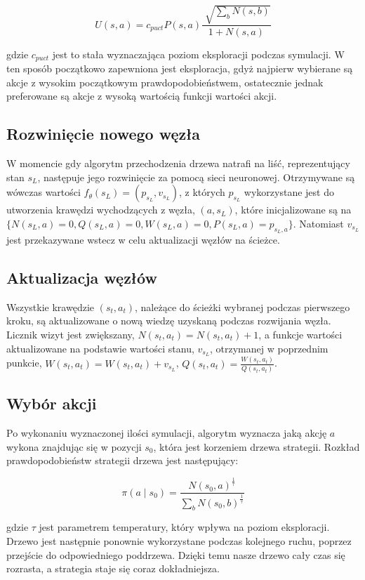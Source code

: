 \documentclass[licencjacka]{pracamgr}
\begin{document}
$$ U(s,a) = c_{puct} P(s,a) \frac{\sqrt[]{\sum_b N(s,b)}}{1 + N(s,a)} $$ 

gdzie $c_{puct}$ jest to stała wyznaczająca poziom eksploracji podczas symulacji. W ten sposób początkowo zapewniona jest eksploracja, gdyż najpierw wybierane są akcje z wysokim początkowym prawdopodobieństwem, ostatecznie jednak preferowane są akcje z wysoką wartością funkcji wartości akcji.

\subsection{Rozwinięcie nowego węzła}

W momencie gdy algorytm przechodzenia drzewa natrafi na liść, reprezentujący stan $s_L$, następuje jego rozwinięcie za pomocą sieci neuronowej. Otrzymywane są wówczas wartości $f_\theta(s_L) = (p_{s_L}, v_{s_L})$, z których $p_{s_L}$ wykorzystane jest do utworzenia krawędzi wychodzących z węzła, $(a, s_L)$, które inicjalizowane są na $\big\{N(s_L, a) = 0, Q(s_L, a) = 0, W(s_L, a) = 0, P(s_L, a) = p_{s_L, a}  \big\}$. Natomiast $v_{s_L}$ jest przekazywane wstecz w celu aktualizacji węzłów na ścieżce.

\subsection{Aktualizacja węzłów}

Wszystkie krawędzie $(s_t, a_t)$, należące do ścieżki wybranej podczas pierwszego kroku, są aktualizowane o nową wiedzę uzyskaną podczas rozwijania węzła. Licznik wizyt jest zwiększany, $N(s_t, a_t) = N(s_t, a_t) + 1$, a funkcje wartości aktualizowane na podstawie wartości stanu, $v_{s_L}$, otrzymanej w poprzednim punkcie, $W(s_t, a_t) = W(s_t, a_t) + v_{s_L}$, $Q(s_t, a_t) = \frac{W(s_t, a_t)}{Q(s_t, a_t)}$.

\subsection{Wybór akcji}

Po wykonaniu wyznaczonej ilości symulacji, algorytm wyznacza jaką akcję $a$ wykona znajdując się w pozycji $s_0$, która jest korzeniem drzewa strategii. Rozkład prawdopodobieństw strategii drzewa jest następujący:

$$
\pi(a \mid s_0) = \frac {N(s_0, a)^{\frac{1}{\tau}}}{\sum_b N(s_0, b)^{\frac{1}{\tau}}}
$$

gdzie $\tau$ jest parametrem temperatury, który wpływa na poziom eksploracji. Drzewo jest następnie ponownie wykorzystane podczas kolejnego ruchu, poprzez przejście do odpowiedniego poddrzewa. Dzięki temu nasze drzewo cały czas się rozrasta, a strategia staje się coraz dokładniejsza.
\end{document}
